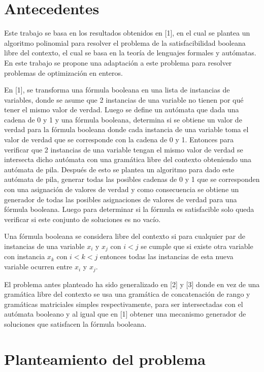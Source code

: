 \documentclass{article}
\begin{document}
\section*{Antecedentes}

Este trabajo se basa en los resultados obtenidos en [1], en el cual se plantea un algoritmo polinomial para resolver el problema de la satisfacibilidad booleana libre del contexto, el cual
se basa en la teoría de lenguajes formales y autómatas. En este trabajo se propone una adaptación a este problema para resolver problemas de optimización en enteros.

En [1], se transforma una fórmula booleana en una lista de instancias de variables, donde se asume que 2 instancias de una variable no tienen por qué
tener el mismo valor de verdad. Luego se define un autómata que dada una cadena de 0 y 1 y una fórmula booleana, determina si se obtiene un valor de verdad para 
la fórmula booleana donde cada instancia de una variable toma el valor de verdad que se corresponde con la cadena de 0 y 1. Entonces para verificar 
que 2 instancias de una variable tengan el mismo valor de verdad se intersecta dicho autómata con una gramática libre del contexto obteniendo una autómata de pila.
Después de esto se plantea un algoritmo para dado este autómata de pila, generar todas las posibles cadenas de 0 y 1 que se corresponden con una asignación de valores de verdad y 
como consecuencia se obtiene un  generador de todas las posibles asignaciones de valores de verdad para una fórmula booleana. Luego para determinar si la fórmula es satisfacible
solo queda verificar si este conjunto de soluciones es no vacío.

Una fórmula booleana se considera libre del contexto si para cualquier par de instancias de una variable $x_i$ y $x_j$ con $i<j$ se cumple que si existe otra variable con instancia 
$x_k$ con $i<k<j$ entonces todas las instancias de esta nueva variable ocurren entre $x_i$ y $x_j$. 

El problema antes planteado ha sido generalizado en [2] y [3] donde en vez de una gramática libre del contexto se usa una gramática de concatenación de rango y gramáticas matriciales simples
respectivamente, para ser intersectadas con el autómata booleano y al igual que en [1] obtener una mecanismo generador de soluciones que satisfacen la fórmula booleana.

\section*{Planteamiento del problema}
\end{document}
